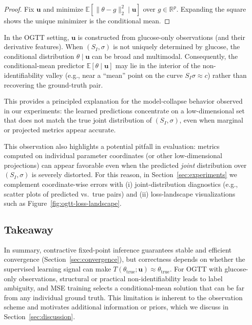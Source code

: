 \begin{proof}
Fix $\mathbf{u}$ and minimize $\mathbb{E}[\|\theta-g\|_2^2\mid \mathbf{u}]$ over $g\in\mathbb{R}^p$.
Expanding the square shows the unique minimizer is the conditional mean.
\end{proof}

In the OGTT setting, $\mathbf{u}$ is constructed from glucose-only observations (and their derivative features).
When $(S_I,\sigma)$ is not uniquely determined by glucose, the conditional distribution $\theta\mid\mathbf{u}$ can be broad and multimodal.
Consequently, the conditional-mean predictor $\mathbb{E}[\theta\mid\mathbf{u}]$ may lie in the interior of the non-identifiability valley
(e.g., near a ``mean'' point on the curve $S_I\sigma\approx c$) rather than recovering the ground-truth pair.

This provides a principled explanation for the model-collapse behavior observed in our experiments:
the learned predictions concentrate on a low-dimensional set that does not match the true joint distribution of $(S_I,\sigma)$,
even when marginal or projected metrics appear accurate.

This observation also highlights a potential pitfall in evaluation:
metrics computed on individual parameter coordinates (or other low-dimensional projections) can appear favorable even when the predicted \emph{joint}
distribution over $(S_I,\sigma)$ is severely distorted.
For this reason, in Section~\ref{sec:experiments} we complement coordinate-wise errors with (i) joint-distribution diagnostics (e.g., scatter plots of
predicted vs.\ true pairs) and (ii) loss-landscape visualizations such as Figure~\ref{fig:ogtt-loss-landscape}.

\subsection{Takeaway}
\label{subsec:correctness-takeaway}

In summary, contractive fixed-point inference guarantees stable and efficient convergence (Section~\ref{sec:convergence}),
but correctness depends on whether the supervised learning signal can make $T(\theta_{\mathrm{true}};\mathbf{u})\approx \theta_{\mathrm{true}}$.
For OGTT with glucose-only observations, structural or practical non-identifiability leads to label ambiguity, and MSE training selects a conditional-mean
solution that can be far from any individual ground truth.
This limitation is inherent to the observation scheme and motivates additional information or priors, which we discuss in Section~\ref{sec:discussion}.